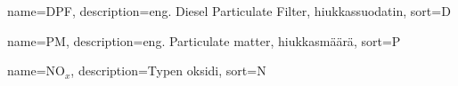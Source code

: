 
{
name={DPF},
description={eng. Diesel Particulate Filter, hiukkassuodatin},
sort={D}
}

{
name={PM},
description={eng. Particulate matter, hiukkasmäärä},
sort={P}
}

{
name={NO\(_x\)},
description={Typen oksidi},
sort={N}
}

